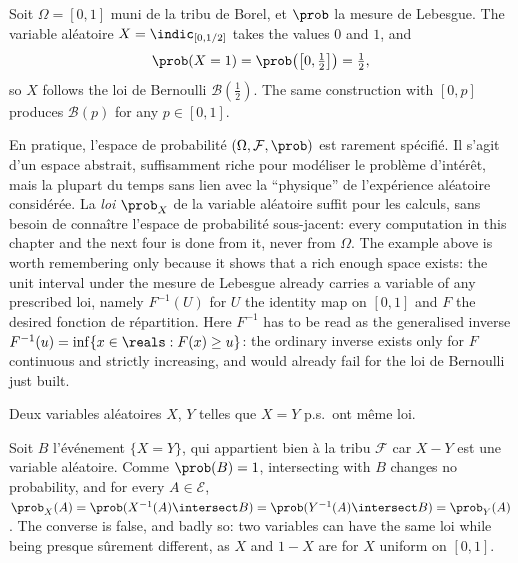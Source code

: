 \begin{example}
  Soit $\Omega = [0,1]$ muni de la tribu de Borel, et $\prob$ la mesure de
  Lebesgue. The variable aléatoire $X = \indic_{[0,1/2]}$ takes the values $0$ and
  $1$, and
  \[
    \prob(X=1) = \prob\!\left(\left[0,\tfrac12\right]\right) = \tfrac12 ,
  \]
  so $X$ follows the loi de Bernoulli $\mathcal{B}(\tfrac12)$. The same
  construction with $[0,p]$ produces $\mathcal{B}(p)$ for any $p \in [0,1]$.
\end{example}

\begin{remark}
  En pratique, l'espace de probabilité $(\Omega,\mathcal{F},\prob)$ est rarement
  spécifié. Il s'agit d'un espace abstrait, suffisamment riche pour modéliser le
  problème d'intérêt, mais la plupart du temps sans lien avec la ``physique'' de
  l'expérience aléatoire considérée. La \emph{loi} $\prob_{X}$ de la variable
  aléatoire suffit pour les calculs, sans besoin de connaître l'espace de
  probabilité sous-jacent: every computation in this chapter and the next four is
  done from it, never from $\Omega$. The example above is worth remembering only
  because it shows that a rich enough space exists: the unit interval under the
  mesure de Lebesgue already carries a variable of any prescribed loi, namely
  $F^{-1}(U)$ for $U$ the identity map on $[0,1]$ and $F$ the desired fonction de
  répartition. Here $F^{-1}$ has to be read as the generalised inverse
  $F^{-1}(u) = \inf\{x \in \reals : F(x) \geq u\}$: the ordinary inverse exists
  only for $F$ continuous and strictly increasing, and would already fail for the
  loi de Bernoulli just built.
\end{remark}

\begin{prop}
  Deux variables aléatoires $X$, $Y$ telles que $X = Y$ p.s.\ ont même loi.
\end{prop}

\begin{remark}
  Soit $B$ l'événement $\{X = Y\}$, qui appartient bien à la tribu $\mathcal{F}$
  car $X - Y$ est une variable aléatoire. Comme $\prob(B)=1$, intersecting with
  $B$ changes no probability, and for every $A \in \mathcal{E}$,
  $\prob_{X}(A) = \prob(X^{-1}(A) \intersect B)
   = \prob(Y^{-1}(A) \intersect B) = \prob_{Y}(A)$.
  The converse is false, and badly so: two variables can have the same loi while
  being presque sûrement different, as $X$ and $1-X$ are for $X$ uniform on
  $[0,1]$.
\end{remark}

